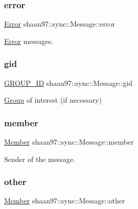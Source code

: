 \subsubsection{\texorpdfstring{error}{error}}
{\footnotesize\ttfamily \hyperlink{classshaan97_1_1sync_1_1_error}{Error} shaan97\+::sync\+::\+Message\+::error}



\hyperlink{classshaan97_1_1sync_1_1_error}{Error} messages. 

\mbox{\label{structshaan97_1_1sync_1_1_message_a43e7dbbfb505261b1d9432ecafbc8699}} 
\subsubsection{\texorpdfstring{gid}{gid}}
{\footnotesize\ttfamily \hyperlink{namespaceshaan97_1_1sync_a34cebf175d27dfc3d82f24608f7043c1}{G\+R\+O\+U\+P\+\_\+\+ID} shaan97\+::sync\+::\+Message\+::gid}



\hyperlink{classshaan97_1_1sync_1_1_group}{Group} of interest (if necessary) 

\mbox{\label{structshaan97_1_1sync_1_1_message_a7abc98c88212d6ad6b0f613957489ad3}} 
\subsubsection{\texorpdfstring{member}{member}}
{\footnotesize\ttfamily \hyperlink{classshaan97_1_1sync_1_1_member}{Member} shaan97\+::sync\+::\+Message\+::member}



Sender of the message. 

\mbox{\label{structshaan97_1_1sync_1_1_message_a1b27154c48628e01d12d4290244c4918}} 
\subsubsection{\texorpdfstring{other}{other}}
{\footnotesize\ttfamily \hyperlink{classshaan97_1_1sync_1_1_member}{Member} shaan97\+::sync\+::\+Message\+::other}



